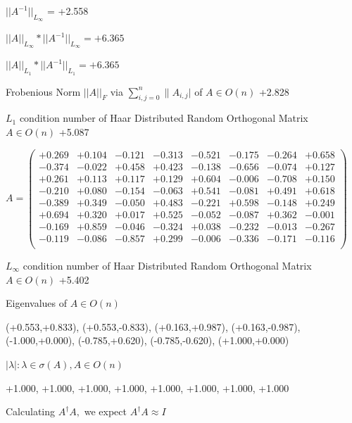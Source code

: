 \documentclass[9pt]{article}
\theoremstyle{plain}
\theoremstyle{definition}
\theoremstyle{remark}
\numberwithin{equation}{section}
\begin{document}
$||A^{-1}||_{L_{\infty}}$ = +2.558

$||A||_{L_{\infty}} * ||A^{-1}||_{L_{\infty}} = +6.365$

$||A||_{L_1} * ||A^{-1}||_{L_1} = +6.365$

Frobenious Norm  $||A||_{\textit{F}}$ via $\sum\limits_{i,j =0}^{n} \|A_{i,j}|$   of  $A \in O(n)$  +2.828

$L_1$ condition number of Haar Distributed Random Orthogonal Matrix $A \in O(n)$ +5.087

$A = \left(
\begin{array}{
cccccccc}
+0.269 & +0.104 & -0.121 & -0.313 & -0.521 & -0.175 & -0.264 & +0.658 \\
-0.374 & -0.022 & +0.458 & +0.423 & -0.138 & -0.656 & -0.074 & +0.127 \\
+0.261 & +0.113 & +0.117 & +0.129 & +0.604 & -0.006 & -0.708 & +0.150 \\
-0.210 & +0.080 & -0.154 & -0.063 & +0.541 & -0.081 & +0.491 & +0.618 \\
-0.389 & +0.349 & -0.050 & +0.483 & -0.221 & +0.598 & -0.148 & +0.249 \\
+0.694 & +0.320 & +0.017 & +0.525 & -0.052 & -0.087 & +0.362 & -0.001 \\
-0.169 & +0.859 & -0.046 & -0.324 & +0.038 & -0.232 & -0.013 & -0.267 \\
-0.119 & -0.086 & -0.857 & +0.299 & -0.006 & -0.336 & -0.171 & -0.116 \\
\end{array}
\right)$ \newline 

$L_{\infty}$ condition number of Haar Distributed Random Orthogonal Matrix $A \in O(n)$ +5.402

Eigenvalues of $A \in O(n)$

(+0.553,+0.833), (+0.553,-0.833), (+0.163,+0.987), (+0.163,-0.987), (-1.000,+0.000), (-0.785,+0.620), (-0.785,-0.620), (+1.000,+0.000)

 $|\lambda | : \lambda \in \sigma(A) , A \in O(n)$

+1.000, +1.000, +1.000, +1.000, +1.000, +1.000, +1.000, +1.000


Calculating $A^{\dag} A,$  we expect $A^{\dag} A \approx I$
\end{document}
